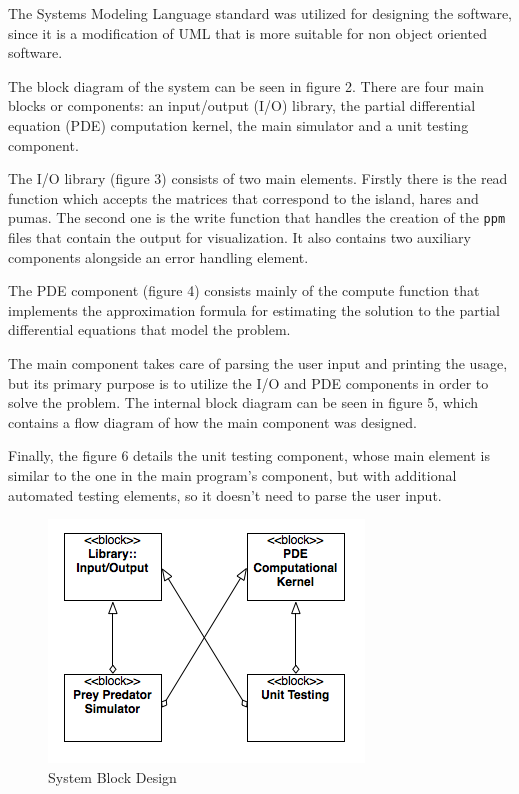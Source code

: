 \documentclass[12pt,a4paper]{article}
\begin{document}
The Systems Modeling Language standard was utilized for designing the software, since it is a modification of UML that is more suitable for non object oriented software. 

The block diagram of the system can be seen in figure 2. There are four main blocks or components: an input/output (I/O) library, the partial differential equation (PDE) computation kernel, the main simulator and a unit testing component.

The I/O library (figure 3) consists of two main elements. Firstly there is the read function which accepts the matrices that correspond to the island, hares and pumas. The second one is the write function that handles the creation of the \texttt{ppm} files that contain the output for visualization. It also contains two auxiliary components alongside an error handling element.

The PDE component (figure 4) consists mainly of the compute function that implements the approximation formula for estimating the solution to the partial differential equations that model the problem.

The main component takes care of parsing the user input and printing the usage, but its primary purpose is to utilize the I/O and PDE components in order to solve the problem. The internal block diagram can be seen in figure 5, which contains a flow diagram of how the main component was designed.

Finally, the figure 6 details the unit testing component, whose main element is similar to the one in the main program's component, but with additional automated testing elements, so it doesn't need to parse the user input.


\begin{figure}[hb]
    \centering
    \includegraphics[scale=0.6]{images/blockdesign.png}
    \caption{System Block Design}
\end{figure}
\end{document}
